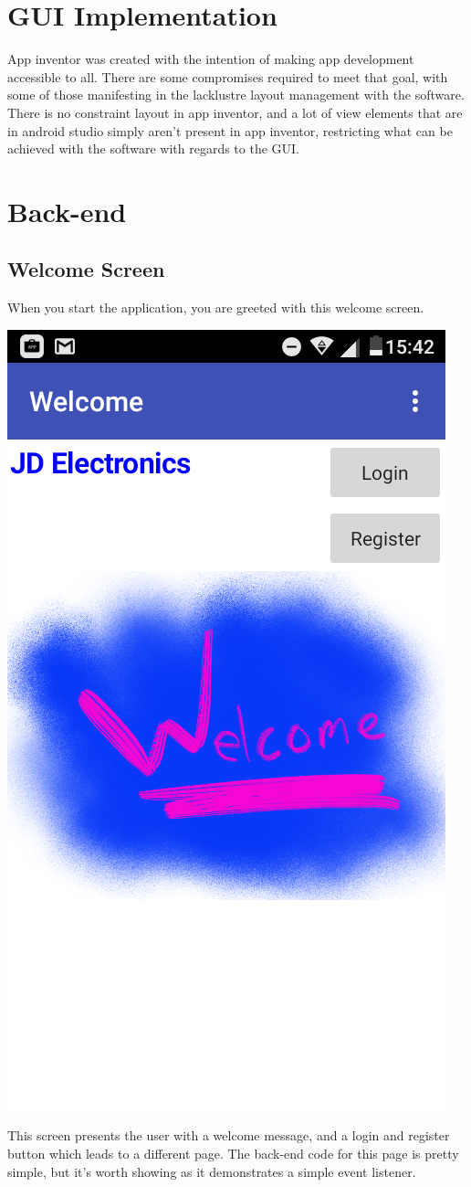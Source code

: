 \documentclass{scrreprt}
\begin{document}
\section{GUI Implementation}

App inventor was created with the intention of making app development accessible to all. There are some compromises required to meet that goal, with some of those manifesting in the lacklustre layout management with the software. There is no constraint layout in app inventor, and a lot of view elements that are in android studio simply aren't present in app inventor, restricting what can be achieved with the software with regards to the GUI.

\section{Back-end}

\subsection{Welcome Screen}

When you start the application, you are greeted with this welcome screen.

\begin{center}
    \includegraphics[width=0.5\linewidth]{images/welcomeDesign.png}
\end{center}

This screen presents the user with a welcome message, and a login and register button which leads to a different page. The back-end code for this page is pretty simple, but it's worth showing as it demonstrates a simple event listener.
\end{document}
